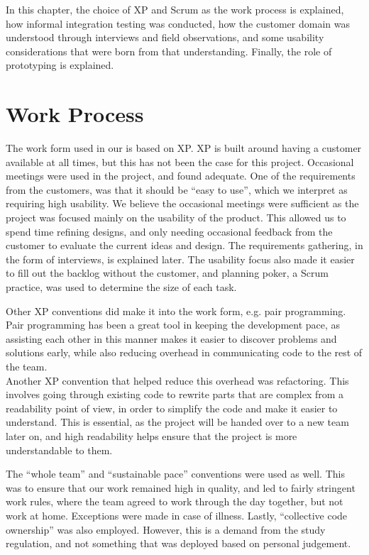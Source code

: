 In this chapter, the choice of XP and Scrum as the work process is explained, how informal integration testing was conducted, how the customer domain was understood through interviews and field observations, and some usability considerations that were born from that understanding.
Finally, the role of prototyping is explained.

\section{Work Process}
\label{launcher_work_form}
The work form used in our \localgroup{} is based on XP. 
XP is built around having a customer available at all times, but this has not been the case for this project. 
Occasional meetings were used in the project, and found adequate. 
One of the requirements from the customers, was that it should be ``easy to use'', which we interpret as requiring high usability. 
We believe the occasional meetings were sufficient as the project was focused mainly on the usability of the product. 
This allowed us to spend time refining designs, and only needing occasional feedback from the customer to evaluate the current ideas and design. 
The requirements gathering, in the form of interviews, is explained later.
The usability focus also made it easier to fill out the backlog without the customer, and planning poker, a Scrum practice, was used to determine the size of each task.

Other XP conventions did make it into the work form, e.g. pair programming. 
Pair programming has been a great tool in keeping the development pace, as assisting each other in this manner makes it easier to discover problems and solutions early, while also reducing overhead in communicating code to the rest of the team. \\

Another XP convention that helped reduce this overhead was refactoring. 
This involves going through existing code to rewrite parts that are complex from a readability point of view, in order to simplify the code and make it easier to understand. 
This is essential, as the project will be handed over to a new team later on, and high readability helps ensure that the project is more understandable to them. 

The \textquotedblleft{}whole team\textquotedblright{} and \textquotedblleft{}sustainable pace\textquotedblright{} conventions were used as well. \citep{XP2}
This was to ensure that our work remained high in quality, and led to fairly stringent work rules, where the team agreed to work through the day together, but not work at home. 
Exceptions were made in case of illness. 
Lastly, \textquotedblleft{}collective code ownership\textquotedblright{} was also employed. 
However, this is a demand from the study regulation, and not something that was deployed based on personal judgement.

